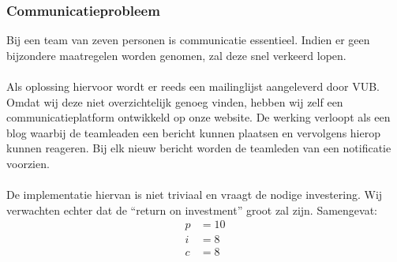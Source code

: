 \subsubsection{Communicatieprobleem}
Bij een team van zeven personen is communicatie essentieel. Indien er geen bijzondere maatregelen worden genomen, zal deze snel verkeerd lopen.
\\
\\
Als oplossing hiervoor wordt er reeds een mailinglijst aangeleverd door VUB. Omdat wij deze niet overzichtelijk genoeg vinden, hebben wij zelf een communicatieplatform ontwikkeld op onze website. De werking verloopt als een blog waarbij de teamleaden een bericht kunnen plaatsen en vervolgens hierop kunnen reageren. Bij elk nieuw bericht worden de teamleden van een notificatie voorzien.
\\
\\
De implementatie hiervan is niet triviaal en vraagt de nodige investering. Wij verwachten echter dat de ``return on investment'' groot zal zijn. Samengevat:
\begin{align*}
	p &= 10\\
	i &= 8\\
	c &= 8
\end{align*}

